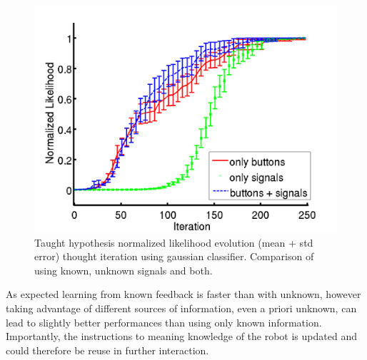 \begin{figure}[!htbp]
	\centering
		\includegraphics[width=\ww\columnwidth]{images/results/mix_button}
	\caption{Taught hypothesis normalized likelihood evolution (mean + std error) thought iteration using gaussian classifier. Comparison of using known, unknown signals and both.}
	\label{fig:button}
\end{figure}

As expected learning from known feedback is faster than with unknown, however taking advantage of different sources of information, even a priori unknown, can lead to slightly better performances than using only known information. Importantly, the instructions to meaning knowledge of the robot is updated and could therefore be reuse in further interaction.

